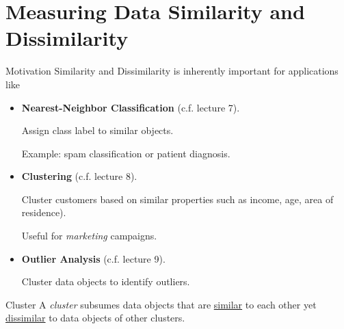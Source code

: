 \section{Measuring Data Similarity and Dissimilarity}

\begin{frame}{Motivation}
	Similarity and Dissimilarity is inherently important for applications like
	\begin{itemize}
		\item \textbf{Nearest-Neighbor Classification} (c.f. lecture 7).

		      Assign class label to similar objects.

		      Example: spam classification or patient diagnosis.
		\item \textbf{Clustering} (c.f. lecture 8).

		      Cluster customers based on similar properties such as income, age, area of residence).

		      Useful for \textit{marketing} campaigns.

		\item \textbf{Outlier Analysis} (c.f. lecture 9).

		      Cluster data objects to identify outliers.
	\end{itemize}

	\begin{block}{Cluster}
		A \textit{cluster} subsumes data objects that are \underline{similar} to
		each other yet \underline{dissimilar} to data objects of other clusters.
	\end{block}

\end{frame}


